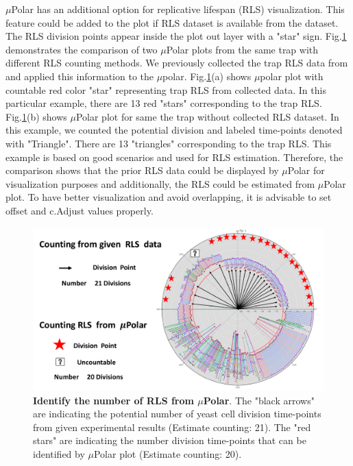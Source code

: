 \documentclass[conference]{IEEEtran}
\begin{document}
$\mu$Polar has an additional option for replicative lifespan (RLS) visualization. This feature could be added to the plot if RLS dataset is available from the dataset. The RLS division points appear inside the plot out layer with a "star" sign. Fig.\ref{fig:rls} demonstrates the comparison of two $\mu$Polar plots from the same trap with different RLS counting methods. We previously collected the trap RLS data from \cite{ref02.2} and applied this information to the $\mu$polar. Fig.\ref{fig:rls}(a) shows $\mu$polar plot with countable red color "star" representing trap RLS from collected data. In this particular example, there are 13 red "stars" corresponding to the trap RLS. Fig.\ref{fig:rls}(b) shows $\mu$Polar plot for same the trap without collected RLS dataset. In this example, we counted the potential division and labeled time-points denoted with "Triangle". There are 13 "triangles" corresponding to the trap RLS. This example is based on good scenarios and used for RLS estimation. Therefore, the comparison shows that the prior RLS data could be displayed by $\mu$Polar for visualization purposes and additionally, the RLS could be estimated from $\mu$Polar plot. To have better visualization and avoid overlapping, it is advisable to set offset and c.Adjust values properly.       

\begin{figure}
\centering
\includegraphics[width=\textwidth,height=10 cm]{Patterns/rlsTp1.pdf}
\caption{ \textbf{Identify the number of RLS from $\mu$Polar}. The "black arrows" are indicating the potential number of yeast cell division time-points from given experimental results (Estimate counting: 21). The "red stars" are indicating the number division time-points that can be identified by $\mu$Polar plot (Estimate counting: 20).}
\label{fig:rls}
\end{figure}
\end{document}

